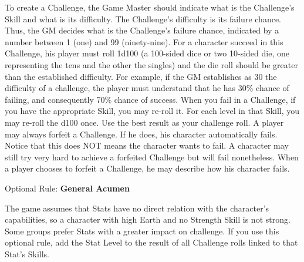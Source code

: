 \begin{multicols}{2}
To create a Challenge, the Game Master should indicate what is the Challenge’s Skill and what is its difficulty. The Challenge’s difficulty is its failure chance. Thus, the GM decides what is the Challenge’s failure chance, indicated by a number between 1 (one) and 99 (ninety-nine). For a character succeed in this Challenge, his player must roll 1d100 (a 100-sided dice or two 10-sided die, one representing the tens and the other the singles) and the die roll should be greater than the established difficulty. For example, if the GM establishes as 30 the difficulty of a challenge, the player must understand that he has 30\% chance of failing, and consequently 70\% chance of success. When you fail in a Challenge, if you have the appropriate Skill, you may re-roll it. For each level in that Skill, you may re-roll the d100 once. Use the best result as your challenge roll. A player may always forfeit a Challenge. If he does, his character automatically fails. Notice that this does NOT means the character wants to fail. A character may still try very hard to achieve a forfeited Challenge but will fail nonetheless. When a player chooses to forfeit a Challenge, he may describe how his character fails.

\begin{boco}
Optional Rule: \textbf{General Acumen}

The game assumes that Stats have no direct relation with the character's capabilities, so a character with high Earth and no Strength Skill is not strong. Some groups prefer Stats with a greater impact on challenge. If you use this optional rule, add the Stat Level to the result of all Challenge rolls linked to that Stat's Skills.
\end{boco}
\end{multicols}
\clearpage
